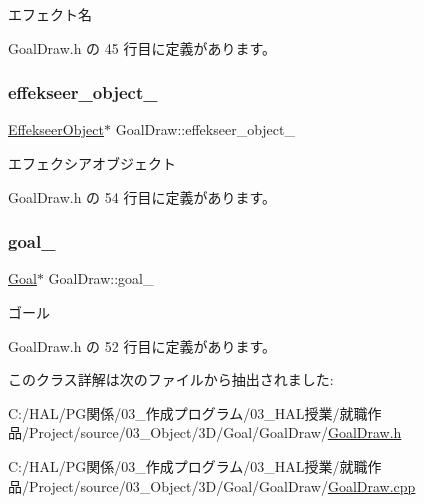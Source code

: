 エフェクト名 



 Goal\+Draw.\+h の 45 行目に定義があります。

\mbox{\label{class_goal_draw_a2d4449f780f6b6fd6dd3e8763fc67b2d}} 
\subsubsection{\texorpdfstring{effekseer\+\_\+object\+\_\+}{effekseer\_object\_}}
{\footnotesize\ttfamily \mbox{\hyperlink{class_effekseer_object}{Effekseer\+Object}}$\ast$ Goal\+Draw\+::effekseer\+\_\+object\+\_\+\hspace{0.3cm}{\ttfamily [private]}}



エフェクシアオブジェクト 



 Goal\+Draw.\+h の 54 行目に定義があります。

\mbox{\label{class_goal_draw_abbb3b4db65f3908bad9b918c6feb6a7a}} 
\subsubsection{\texorpdfstring{goal\+\_\+}{goal\_}}
{\footnotesize\ttfamily \mbox{\hyperlink{class_goal}{Goal}}$\ast$ Goal\+Draw\+::goal\+\_\+\hspace{0.3cm}{\ttfamily [private]}}



ゴール 



 Goal\+Draw.\+h の 52 行目に定義があります。



このクラス詳解は次のファイルから抽出されました\+:\begin{DoxyCompactItemize}
\item 
C\+:/\+H\+A\+L/\+P\+G関係/03\+\_\+作成プログラム/03\+\_\+\+H\+A\+L授業/就職作品/\+Project/source/03\+\_\+\+Object/3\+D/\+Goal/\+Goal\+Draw/\mbox{\hyperlink{_goal_draw_8h}{Goal\+Draw.\+h}}\item 
C\+:/\+H\+A\+L/\+P\+G関係/03\+\_\+作成プログラム/03\+\_\+\+H\+A\+L授業/就職作品/\+Project/source/03\+\_\+\+Object/3\+D/\+Goal/\+Goal\+Draw/\mbox{\hyperlink{_goal_draw_8cpp}{Goal\+Draw.\+cpp}}\end{DoxyCompactItemize}
